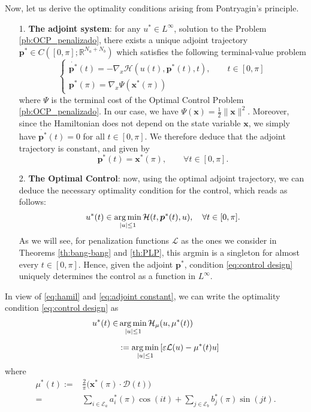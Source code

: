 \documentclass[twocolumn]{autart}    %
\begin{document}
Now, let us derive the optimality conditions arising from Pontryagin's principle.
\begin{itemize}
	\item[1.] \textbf{The adjoint system}: for any $u^\ast \in L^\infty$, solution to the Problem \ref{pb:OCP_penalizado}, there exists a unique adjoint trajectory $\bm{p}^\ast\in C([0,\pi]; \mathbb{R}^{N_a+N_b})$ which satisfies the following terminal-value problem
    \begin{equation*}
    	\begin{cases}
    		\dot{\bm{p}^\ast}(t) = -\nabla_x \mathcal{H}(u(t),\bm{p}^\ast(t),t), \qquad t \in [0,\pi] 
    		\\[5pt]
    		\bm{p}^\ast (\pi) = \nabla_x \Psi (\bm{x}^\ast (\pi))
    	\end{cases}
    \end{equation*}
    where $\Psi$ is the terminal cost of the Optimal Control Problem \ref{pb:OCP_penalizado}. In our case, we have $\Psi (\bm{x}) = \frac{1}{2} \| \bm{x}\|^2$. Moreover, since the Hamiltonian does not depend on the state variable $\bm{x}$, we simply have $\dot{\bm{p}^\ast}(t) = 0$ for all $t \in [0,\pi]$. We therefore deduce that the adjoint trajectory is constant, and given by
    \begin{equation}\label{eq:adjoint constant}
		\bm{p}^\ast (t) = \bm{x}^\ast (\pi), \qquad \forall t \in [0,\pi]. 
	\end{equation}
    
    \item[2.] \textbf{The Optimal  Control}: now, using the optimal adjoint trajectory, we can deduce the necessary optimality condition for the control, which reads as follows:
    \begin{align}\label{eq:control design}
    	u^* (t) \in \operatorname*{arg\,min}_{|u|\leq 1} \mathcal{H}(t,\bm{p}^*(t),u), \quad \forall t \in [0,\pi].
    \end{align}
    As we will see, for penalization functions $\mathcal{L}$ as the ones we consider in Theorems \ref{th:bang-bang} and \ref{th:PLP}, this argmin is a singleton for almost every $t\in [0,\pi]$. Hence, given the adjoint $\bm{p}^\ast$,  condition \eqref{eq:control design} uniquely determines the control as a function in $L^\infty$.
\end{itemize}
    
In view of \eqref{eq:hamil} and \eqref{eq:adjoint constant}, we can write the optimality condition \eqref{eq:control design} as
\begin{align}\label{eq:control design2}
    u^\ast(t)  \in & \operatorname*{arg\,min}_{|u|\leq 1}  \mathcal{H}_\mu (u,\mu^\ast(t))  
    \\[5pt]
    &:=\operatorname*{arg\,min}_{|u|\leq 1}   \left[\varepsilon \mathcal{L}(u) - \mu^\ast(t) u \right] \nonumber
\end{align}    
where 
\begin{align}\label{eq:m ast}
    \mu^\ast (t) := & \frac 2\pi \big(\bm{x}^*(\pi) \cdot \bm{\mathcal{D}}(t)\big) 
    \\[5pt]
    = & \sum_{i \in \mathcal{E}_a} a^*_i (\pi) \cos(it) + \sum_{j \in \mathcal{E}_b} b^*_j (\pi) \sin(jt). \nonumber
\end{align}
\end{document}
